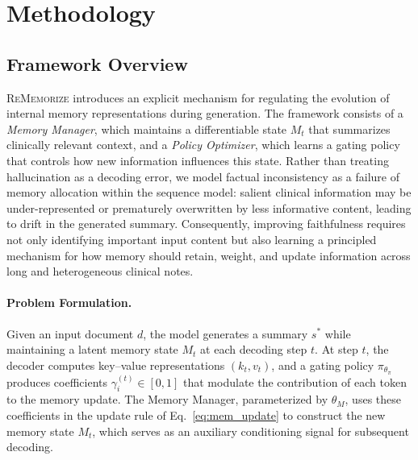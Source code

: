 \documentclass{article}
\begin{document}
\section{Methodology}

\subsection{Framework Overview}
\textsc{ReMemorize} introduces an explicit mechanism for regulating the evolution of internal memory representations during generation. The framework consists of a \emph{Memory Manager}, which maintains a differentiable state $M_t$ that summarizes clinically relevant context, and a \emph{Policy Optimizer}, which learns a gating policy that controls how new information influences this state. Rather than treating hallucination as a decoding error, we model factual inconsistency as a failure of memory allocation within the sequence model: salient clinical information may be under-represented or prematurely overwritten by less informative content, leading to drift in the generated summary. Consequently, improving faithfulness requires not only identifying important input content but also learning a principled mechanism for how memory should retain, weight, and update information across long and heterogeneous clinical notes.

\paragraph{Problem Formulation.}
Given an input document $d$, the model generates a summary $s^*$ while maintaining a latent memory state $M_t$ at each decoding step $t$.
At step $t$, the decoder computes key--value representations $(k_t, v_t)$, and a gating policy $\pi_{\theta_\pi}$ produces coefficients $\gamma_i^{(t)} \in [0,1]$ that modulate the contribution of each token to the memory update.
The Memory Manager, parameterized by $\theta_M$, uses these coefficients in the update rule of Eq.~\ref{eq:mem_update} to construct the new memory state $M_t$, which serves as an auxiliary conditioning signal for subsequent decoding.
\end{document}
